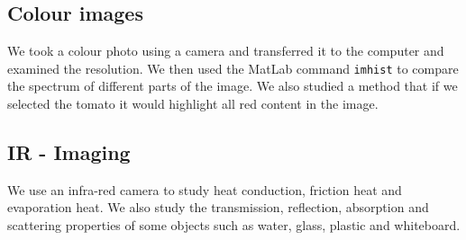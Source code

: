 \subsection{Colour images}
We took a colour photo using a camera and transferred it to the computer and examined the resolution. We then used the MatLab command \texttt{imhist} to compare the spectrum of different parts of the image. %
We also studied a method that if we selected the tomato it would highlight all red content in the image.

\subsection{IR - Imaging}
We use an infra-red camera to study heat conduction, friction heat and evaporation heat. We also study the transmission, reflection, absorption and scattering properties of some objects such as water, glass, plastic and whiteboard.